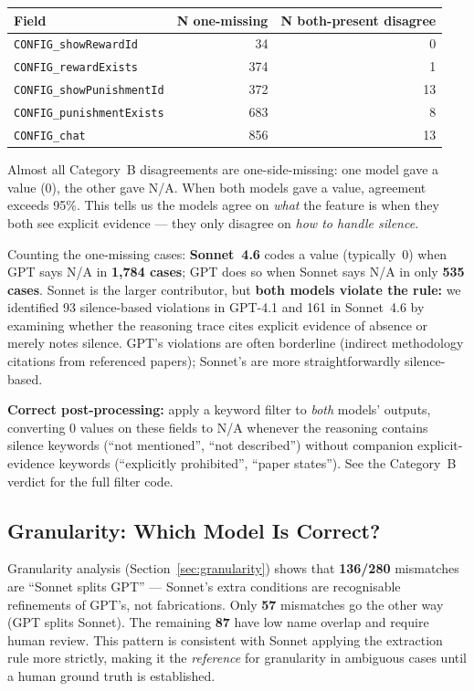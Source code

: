 \documentclass[11pt,a4paper]{article}
\begin{document}
        \begin{center}\small
\begin{tabular}{lrr}
\toprule
\textbf{Field} & \textbf{N one-missing} & \textbf{N both-present disagree} \\
\midrule
\texttt{CONFIG\_showRewardId} & 34 & 0 \\
\texttt{CONFIG\_rewardExists} & 374 & 1 \\
\texttt{CONFIG\_showPunishmentId} & 372 & 13 \\
\texttt{CONFIG\_punishmentExists} & 683 & 8 \\
\texttt{CONFIG\_chat} & 856 & 13 \\
\bottomrule
\end{tabular}
\end{center}

        Almost all Category~B disagreements are one-side-missing: one model gave a value
        (0), the other gave N/A.  When both models gave a value, agreement exceeds 95\%.
        This tells us the models agree on \emph{what} the feature is when they both
        see explicit evidence --- they only disagree on \emph{how to handle silence}.

        Counting the one-missing cases: \textbf{Sonnet~4.6} codes a value (typically~0)
        when GPT says N/A in \textbf{1{,}784 cases}; GPT does so when Sonnet says N/A
        in only \textbf{535 cases}.  Sonnet is the larger contributor, but
        \textbf{both models violate the rule:} we identified 93 silence-based
        violations in GPT-4.1 and 161 in Sonnet~4.6 by examining whether the
        reasoning trace cites explicit evidence of absence or merely notes silence.
        GPT's violations are often borderline (indirect methodology citations from
        referenced papers); Sonnet's are more straightforwardly silence-based.

        \textbf{Correct post-processing:} apply a keyword filter to \emph{both}
        models' outputs, converting 0 values on these fields to N/A whenever the
        reasoning contains silence keywords (``not mentioned'', ``not described'')
        without companion explicit-evidence keywords (``explicitly prohibited'',
        ``paper states'').  See the Category~B verdict for the full filter code.

        \subsection{Granularity: Which Model Is Correct?}
        Granularity analysis (Section~\ref{sec:granularity}) shows that
\textbf{136/280} mismatches are ``Sonnet splits GPT'' ---
Sonnet's extra conditions are recognisable refinements of GPT's, not
fabrications.  Only \textbf{57} mismatches go the other way (GPT splits
Sonnet).  The remaining \textbf{87} have low name overlap and require
human review.  This pattern is consistent with Sonnet applying the extraction
rule more strictly, making it the \emph{reference} for granularity in
ambiguous cases until a human ground truth is established.
\end{document}
